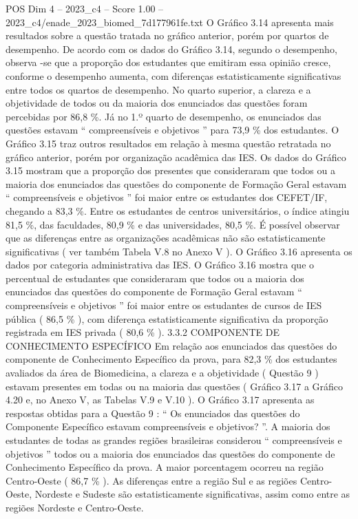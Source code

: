 \begin{textsample}{POS Dim 4 – 2023\_c4 – Score 1.00 – 2023\_c4/enade\_2023\_biomed\_7d177961fe.txt}
O Gráfico 3.14 apresenta mais resultados sobre a questão tratada no gráfico anterior, porém por quartos de desempenho.
De acordo com os dados do Gráfico 3.14, segundo o desempenho, observa -se que a proporção dos estudantes que emitiram essa opinião cresce, conforme o desempenho aumenta, com diferenças estatisticamente significativas entre todos os quartos de desempenho.
No quarto superior, a clareza e a objetividade de todos ou da maioria dos enunciados das questões foram percebidas por 86,8 \%.
Já no 1.º quarto de desempenho, os enunciados das questões estavam “ compreensíveis e objetivos ” para 73,9 \% dos estudantes.
O Gráfico 3.15 traz outros resultados em relação à mesma questão retratada no gráfico anterior, porém por organização acadêmica das IES.
Os dados do Gráfico 3.15 mostram que a proporção dos presentes que consideraram que todos ou a maioria dos enunciados das questões do componente de Formação Geral estavam “ compreensíveis e objetivos ” foi maior entre os estudantes dos CEFET/IF, chegando a 83,3 \%.
Entre os estudantes de centros universitários, o índice atingiu 81,5 \%, das faculdades, 80,9 \% e das universidades, 80,5 \%.
É possível observar que as diferenças entre as organizações acadêmicas não são estatisticamente significativas ( ver também Tabela V.8 no Anexo V ).
O Gráfico 3.16 apresenta os dados por categoria administrativa das IES.
O Gráfico 3.16 mostra que o percentual de estudantes que consideraram que todos ou a maioria dos enunciados das questões do componente de Formação Geral estavam “ compreensíveis e objetivos ” foi maior entre os estudantes de cursos de IES pública ( 86,5 \% ), com diferença estatisticamente significativa da proporção registrada em IES privada ( 80,6 \% ). 3.3.2 COMPONENTE DE CONHECIMENTO ESPECÍFICO Em relação aos enunciados das questões do componente de Conhecimento Específico da prova, para 82,3 \% dos estudantes avaliados da área de Biomedicina, a clareza e a objetividade ( Questão 9 ) estavam presentes em todas ou na maioria das questões ( Gráfico 3.17 a Gráfico 4.20 e, no Anexo V, as Tabelas V.9 e V.10 ).
O Gráfico 3.17 apresenta as respostas obtidas para a Questão 9 : “ Os enunciados das questões do Componente Específico estavam compreensíveis e objetivos? ”.
A maioria dos estudantes de todas as grandes regiões brasileiras considerou “ compreensíveis e objetivos ” todos ou a maioria dos enunciados das questões do componente de Conhecimento Específico da prova.
A maior porcentagem ocorreu na região Centro-Oeste ( 86,7 \% ).
As diferenças entre a região Sul e as regiões Centro-Oeste, Nordeste e Sudeste são estatisticamente significativas, assim como entre as regiões Nordeste e Centro-Oeste.

\end{textsample}

